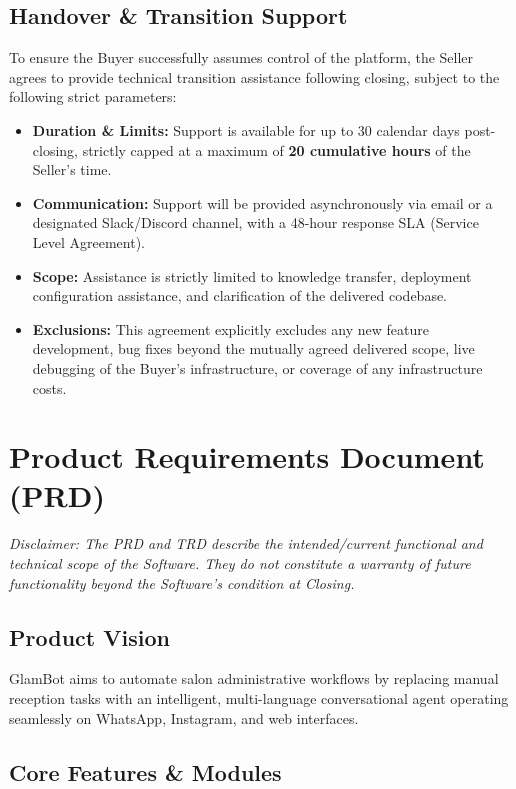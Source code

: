 \documentclass[11pt,a4paper]{report}
\begin{document}
\section{Handover \& Transition Support}
To ensure the Buyer successfully assumes control of the platform, the Seller agrees to provide technical transition assistance following closing, subject to the following strict parameters:
\begin{itemize}
    \item \textbf{Duration \& Limits:} Support is available for up to 30 calendar days post-closing, strictly capped at a maximum of \textbf{20 cumulative hours} of the Seller's time.
    \item \textbf{Communication:} Support will be provided asynchronously via email or a designated Slack/Discord channel, with a 48-hour response SLA (Service Level Agreement).
    \item \textbf{Scope:} Assistance is strictly limited to knowledge transfer, deployment configuration assistance, and clarification of the delivered codebase. 
    \item \textbf{Exclusions:} This agreement explicitly excludes any new feature development, bug fixes beyond the mutually agreed delivered scope, live debugging of the Buyer's infrastructure, or coverage of any infrastructure costs.
\end{itemize}

\chapter{Product Requirements Document (PRD)}
\textit{Disclaimer: The PRD and TRD describe the intended/current functional and technical scope of the Software. They do not constitute a warranty of future functionality beyond the Software's condition at Closing.}

\section{Product Vision}
GlamBot aims to automate salon administrative workflows by replacing manual reception tasks with an intelligent, multi-language conversational agent operating seamlessly on WhatsApp, Instagram, and web interfaces.

\section{Core Features \& Modules}
\end{document}
